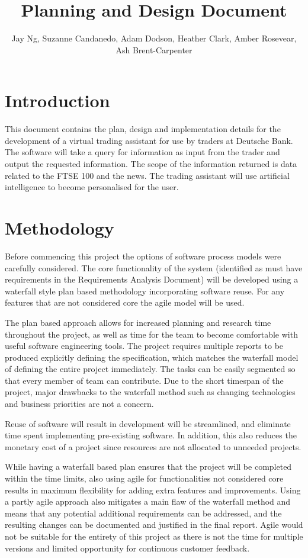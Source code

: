 \documentclass[]{IEEEtran}
\title{Planning and Design Document}
\author{Jay Ng, Suzanne Candanedo, Adam Dodson, Heather Clark, Amber Rosevear, Ash Brent-Carpenter}
\begin{document}
	\maketitle

	\section{Introduction}
	This document contains the plan, design and implementation details for the development of a virtual trading assistant for use by traders at Deutsche Bank. The software will take a query for information as input from the trader and output the requested information. The scope of the information returned is data related to the FTSE 100 and the news. The trading assistant will use artificial intelligence to become personalised for the user.
	
	\section{Methodology}
	Before commencing this project the options of software process models were carefully considered. The core functionality of the system (identified as must have requirements in the Requirements Analysis Document) will be developed using a waterfall style plan based methodology incorporating software reuse. For any features that are not considered core the agile model will be used.
	
	The plan based approach allows for increased planning and research time throughout the project, as well as time for the team to become comfortable with useful software engineering tools. The project requires multiple reports to be produced explicitly defining the specification, which matches the waterfall model of defining the entire project immediately. The tasks can be easily segmented so that every member of team can contribute. Due to the short timespan of the project, major drawbacks to the waterfall method such as changing technologies and business priorities are not a concern.
	
	Reuse of software will result in development will be streamlined, and eliminate time spent implementing pre-existing software. In addition, this also reduces the monetary cost of a project since resources are not allocated to unneeded projects.
	
	While having a waterfall based plan ensures that the project will be completed within the time limits, also using agile for functionalities not considered core results in maximum flexibility for adding extra features and improvements. Using a partly agile approach also mitigates a main flaw of the waterfall method and means that any potential additional requirements can be addressed, and the resulting changes can be documented and justified in the final report. Agile would not be suitable for the entirety of this project as there is not the time for multiple versions and limited opportunity for continuous customer feedback. 
	
\end{document}
